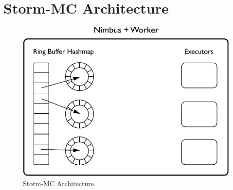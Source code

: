 \documentclass[bsc,logo,frontabs,twoside,singlespacing,normalheadings,parskip]{infthesis}     %
\let\Oldtodo\todo
\renewcommand{\todo}[1]{\Oldtodo[inline]{#1}}
\begin{document}

\section{Storm-MC Architecture}

\begin{figure}[!htb]
	\centering
	\includegraphics[scale=0.7]{pdf/storm_mc_arch.pdf}
	\caption{Storm-MC Architecture.}
	\label{fig:architecture}
\end{figure}
\end{document}
